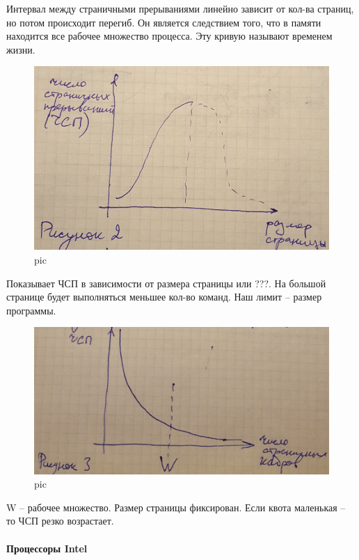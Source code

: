 Интервал между страничными прерываниями линейно зависит от кол-ва страниц, но потом происходит перегиб. Он является следствием того, что в памяти находится все рабочее множество процесса. Эту кривую называют временем жизни.

\begin{figure}[H]
    \centering
    \includegraphics[width=\textwidth]{pic/2.png}
    \caption{pic}
\end{figure}

Показывает ЧСП в зависимости от размера страницы или ???. На большой странице будет выполняться меньшее кол-во команд. Наш лимит – размер программы. 

\begin{figure}[H]
    \centering
    \includegraphics[width=\textwidth]{pic/3.png}
    \caption{pic}
\end{figure}

W – рабочее множество. Размер страницы фиксирован. Если квота маленькая – то ЧСП резко возрастает. 

\paragraph{Процессоры Intel}

